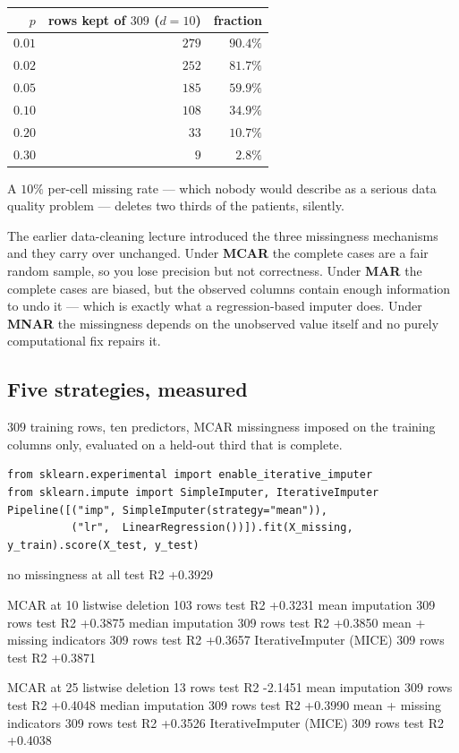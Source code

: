 \documentclass[11pt]{article}
\begin{document}
\begin{center}
\begin{tabular}{@{}rrr@{}}
\toprule
$p$ & rows kept of $309$ ($d=10$) & fraction\\
\midrule
$0.01$ & $279$ & $90.4\%$\\
$0.02$ & $252$ & $81.7\%$\\
$0.05$ & $185$ & $59.9\%$\\
$0.10$ & $108$ & $34.9\%$\\
$0.20$ & $\phantom{0}33$ & $10.7\%$\\
$0.30$ & $\phantom{00}9$ & $\phantom{0}2.8\%$\\
\bottomrule
\end{tabular}
\end{center}

A $10\%$ per-cell missing rate --- which nobody would describe as a serious
data quality problem --- deletes two thirds of the patients, silently.

The earlier data-cleaning lecture introduced the three missingness mechanisms
and they carry over unchanged. Under \textbf{MCAR} the complete cases are a
fair random sample, so you lose precision but not correctness. Under
\textbf{MAR} the complete cases are biased, but the observed columns contain
enough information to undo it --- which is exactly what a regression-based
imputer does. Under \textbf{MNAR} the missingness depends on the unobserved
value itself and no purely computational fix repairs it.

\subsection{Five strategies, measured}

$309$ training rows, ten predictors, MCAR missingness imposed on the training
columns only, evaluated on a held-out third that is complete.

\begin{lstlisting}
from sklearn.experimental import enable_iterative_imputer
from sklearn.impute import SimpleImputer, IterativeImputer
Pipeline([("imp", SimpleImputer(strategy="mean")),
          ("lr",  LinearRegression())]).fit(X_missing, y_train).score(X_test, y_test)
\end{lstlisting}
\begin{codeout}
no missingness at all                test R2 +0.3929

MCAR at 10%
   listwise deletion            103 rows   test R2 +0.3231
   mean imputation              309 rows   test R2 +0.3875
   median imputation            309 rows   test R2 +0.3850
   mean + missing indicators    309 rows   test R2 +0.3657
   IterativeImputer (MICE)      309 rows   test R2 +0.3871

MCAR at 25%
   listwise deletion             13 rows   test R2 -2.1451
   mean imputation              309 rows   test R2 +0.4048
   median imputation            309 rows   test R2 +0.3990
   mean + missing indicators    309 rows   test R2 +0.3526
   IterativeImputer (MICE)      309 rows   test R2 +0.4038
\end{codeout}
\end{document}
